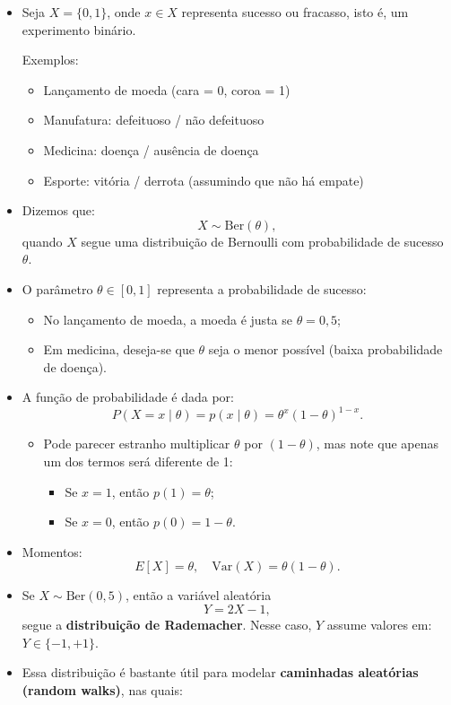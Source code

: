 \documentclass[
  letterpaper,
  DIV=11,
  numbers=noendperiod]{scrreprt}
\providecommand{\tightlist}{%
  \setlength{\itemsep}{0pt}\setlength{\parskip}{0pt}}\usepackage{longtable,booktabs,array}
\begin{document}
\begin{itemize}
\item
  Seja \(X = \{0,1\}\), onde \(x \in X\) representa sucesso ou fracasso,
  isto é, um experimento binário.

  Exemplos:

  \begin{itemize}
  \tightlist
  \item
    Lançamento de moeda (cara = 0, coroa = 1)
  \item
    Manufatura: defeituoso / não defeituoso
  \item
    Medicina: doença / ausência de doença
  \item
    Esporte: vitória / derrota (assumindo que não há empate)
  \end{itemize}
\item
  Dizemos que: \[X \sim \text{Ber}(\theta),\] quando \(X\) segue uma
  distribuição de Bernoulli com probabilidade de sucesso \(\theta\).
\item
  O parâmetro \(\theta \in [0,1]\) representa a probabilidade de
  sucesso:

  \begin{itemize}
  \tightlist
  \item
    No lançamento de moeda, a moeda é justa se \(\theta = 0{,}5\);
  \item
    Em medicina, deseja-se que \(\theta\) seja o menor possível (baixa
    probabilidade de doença).
  \end{itemize}
\item
  A função de probabilidade é dada por:
  \[P(X = x \mid \theta) = p(x \mid \theta) = \theta^x (1 - \theta)^{1-x}.\]

  \begin{itemize}
  \tightlist
  \item
    Pode parecer estranho multiplicar \(\theta\) por \((1 - \theta)\),
    mas note que apenas um dos termos será diferente de 1:

    \begin{itemize}
    \tightlist
    \item
      Se \(x = 1\), então \(p(1) = \theta\);
    \item
      Se \(x = 0\), então \(p(0) = 1 - \theta\).
    \end{itemize}
  \end{itemize}
\item
  Momentos: \[E[X] = \theta, \quad \text{Var}(X) = \theta(1 - \theta).\]
\item
  Se \(X \sim \text{Ber}(0{,}5)\), então a variável aleatória
  \[Y = 2X - 1,\] segue a \textbf{distribuição de Rademacher}. Nesse
  caso, \(Y\) assume valores em: \(Y \in \{-1, +1\}.\)
\item
  Essa distribuição é bastante útil para modelar \textbf{caminhadas
  aleatórias (random walks)}, nas quais:


\end{itemize}
\end{document}
